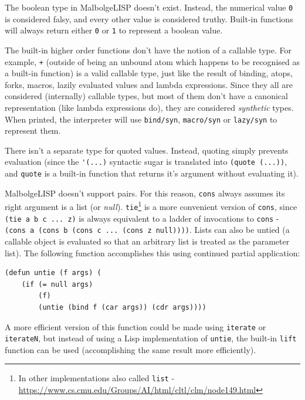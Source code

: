 \par The boolean type in MalbolgeLISP doesn't exist. Instead, the numerical value \verb|0| is considered falsy, and every other value is considered truthy. Built-in functions will always return either \verb|0| or \verb|1| to represent a boolean value.

\par The built-in higher order functions don't have the notion of a callable type. For example, \verb|+| (outside of being an unbound atom which happens to be recognised as a built-in function) is a valid callable type, just like the result of binding, atops, forks, macros, lazily evaluated values and lambda expressions. Since they all are considered (internally) callable types, but most of them don't have a canonical representation (like lambda expressions do), they are considered \textit{synthetic} types. When printed, the interpreter will use \verb|bind/syn|, \verb|macro/syn| or \verb|lazy/syn| to represent them.

\par There isn't a separate type for quoted values. Instead, quoting simply prevents evaluation (since the \verb|'(...)| syntactic sugar is translated into \verb|(quote (...))|, and \verb|quote| is a built-in function that returns it's argument without evaluating it).

\par MalbolgeLISP doesn't support pairs. For this reason, \verb|cons| always assumes its right argument is a list (or \textit{null}). \verb|tie|\footnote{In other implementations also called \verb|list| -  \url{https://www.cs.cmu.edu/Groups/AI/html/cltl/clm/node149.html}} is a more convenient version of \verb|cons|, since \verb|(tie a b c ... z)| is always equivalent to a ladder of invocations to \verb|cons| - \verb|(cons a (cons b (cons c ... (cons z null))))|. Lists can also be untied (a callable object is evaluated so that an arbitrary list is treated as the parameter list). The following function accomplishes this using continued partial application:

\begin{verbatim}
(defun untie (f args) (
    (if (= null args)
        (f)
        (untie (bind f (car args)) (cdr args))))
\end{verbatim}

\par A more efficient version of this function could be made using \verb|iterate| or \verb|iterateN|, but instead of using a Lisp implementation of \verb|untie|, the built-in \verb|lift| function can be used (accomplishing the same result more efficiently).

